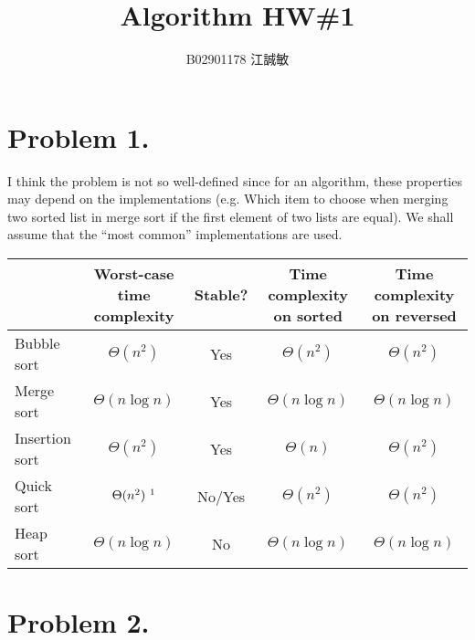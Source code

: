 \documentclass[12pt, a4paper]{article}
\title{Algorithm HW\#1}
\author{B02901178 江誠敏}
\begin{document}
\maketitle
\section{Problem 1.}
I think the problem is not so well-defined since for an algorithm, 
these properties may depend on the implementations (e.g. Which item to choose when merging
two sorted list in merge sort if the first element of two lists are equal). We shall assume
that the ``most common'' implementations are used.


\begin{table}[h]
  \centering
  \begin{tabular}{lcccc}
    &
    \multicolumn{1}{m{3cm}}{\centering Worst-case time complexity} &
    \multicolumn{1}{m{3cm}}{\centering Stable?} &
    \multicolumn{1}{m{3cm}}{\centering Time complexity on sorted} &
    \multicolumn{1}{m{3cm}}{\centering Time complexity on reversed} \\
    \hline
    Bubble sort & $\Theta(n^2)$ & Yes & $\Theta(n^2)$ & $\Theta(n^2)$ \\
    Merge sort & $\Theta(n \log n)$ & Yes & $\Theta(n \log n)$ & $\Theta(n \log n)$ \\
    Insertion sort & $\Theta(n^2)$ & Yes & $\Theta(n)$ & $\Theta(n^2)$ \\ 
    Quick sort & $\Theta(n^2) \ \footnotemark $ & No\footnotemark/Yes\footnotemark
    & $\Theta(n^2)$ & $\Theta(n^2)$ \\ 
    Heap sort & $\Theta(n \log n)$ & No & $\Theta(n \log n)$ & $\Theta(n \log n)$
  \end{tabular}
\end{table}

\section{Problem 2.}
\end{document}
